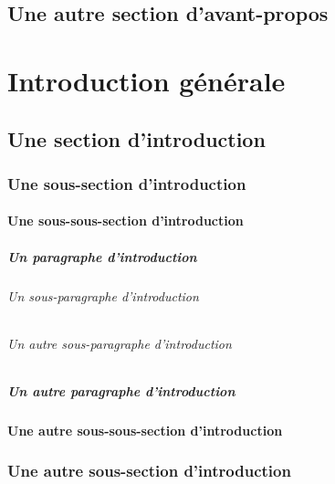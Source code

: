 \documentclass[12pt,space=onehalf,version=final]{yathesis}
\begin{document}
\section{Une autre section d'avant-propos}
\lipsum[30-35]
%
\tableofcontents[depth=chapter,name=Sommaire]
%
%
%
%
\mainmatter
%
\chapter*{Introduction générale}
\lipsum[26]
\section{Une section d'introduction}
\lipsum[28]
\subsection{Une sous-section d'introduction}
\lipsum[29]
\subsubsection{Une sous-sous-section d'introduction}
\lipsum[30]
\paragraph{Un paragraphe d'introduction}
\lipsum[31]
\subparagraph{Un sous-paragraphe d'introduction}
\lipsum[32]
\subparagraph{Un autre sous-paragraphe d'introduction}
\lipsum[33]
\paragraph{Un autre paragraphe d'introduction}
\lipsum[34]
\subsubsection{Une autre sous-sous-section d'introduction}
\lipsum[35]
\subsection{Une autre sous-section d'introduction}
\lipsum[36]
\end{document}
